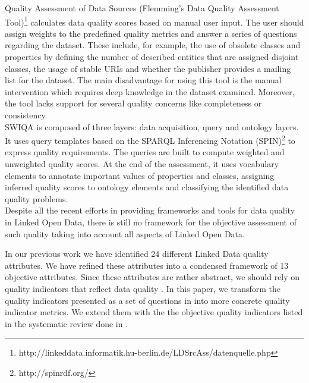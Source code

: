 \documentclass[onecolumn, crcready]{iosart2c}
\begin{document}
Quality Assessment of Data Sources (Flemming's Data Quality Assessment Tool)\footnote{http://linkeddata.informatik.hu-berlin.de/LDSrcAss/datenquelle.php} calculates data quality scores based on manual user input. The user should assign weights to the predefined quality metrics and answer a series of questions regarding the dataset. These include, for example, the use of obsolete classes and properties by defining the number of described entities that are assigned disjoint classes, the usage of stable URIs and whether the publisher provides a mailing list for the dataset. The main disadvantage for using this tool is the manual intervention which requires deep knowledge in the dataset examined. Moreover, the tool lacks support for several quality concerns like completeness or consistency.\\


SWIQA \cite{Furber2011a} is composed of three layers: data acquisition, query and ontology layers. It uses query templates based on the SPARQL Inferencing Notation (SPIN)\footnote{http://spinrdf.org/} to express quality requirements. The queries are built to compute weighted and unweighted quality scores. At the end of the assessment, it uses vocabulary elements to annotate important values of properties and classes, assigning inferred quality scores to ontology elements and classifying the identified data quality problems.\\

Despite all the recent efforts in providing frameworks and tools for data quality in Linked Open Data, there is still no framework for the objective assessment of such quality taking into account all aspects of Linked Open Data.

In our previous work \cite{assaf2012} we have identified 24 different Linked Data quality attributes. We have refined these attributes into a condensed framework of 13 objective attributes. Since these attributes are rather abstract, we should rely on quality indicators that reflect data quality \cite{flemming2010}. In this paper, we transform the quality indicators presented as a set of questions in \cite{assaf2012} into more concrete quality indicator metrics. We extend them with the the objective quality indicators listed in the systematic review done in \cite{Framework2012}.\\
\end{document}
